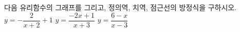 다음 유리함수의 그래프를 그리고, 정의역, 치역, 점근선의 방정식을 구하시오.
 $y=-\dfrac{2}{x+2}+1$
 $y=\dfrac{-2x+1}{x+3}$
 $y=\dfrac{6-x}{x-3}$
